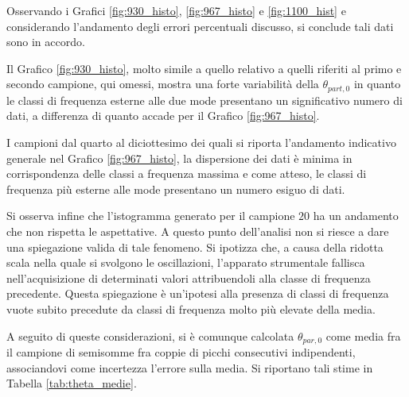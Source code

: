 \documentclass[a4paper,11pt,oneside]{article}
\begin{document}
Osservando i Grafici \ref{fig:930_histo}, \ref{fig:967_histo} e  \ref{fig:1100_hist} e considerando l'andamento degli errori percentuali discusso, si conclude tali dati sono in accordo.

Il Grafico \ref{fig:930_histo}, molto simile a quello relativo a quelli riferiti al primo e secondo campione, qui omessi, mostra una forte variabilità della $\theta_{part,0}$ in quanto le classi di frequenza esterne alle due mode presentano un significativo numero di dati, a differenza di quanto accade per il Grafico \ref{fig:967_histo}.

I campioni dal quarto al diciottesimo dei quali si riporta l'andamento indicativo generale nel Grafico \ref{fig:967_histo}, la dispersione dei dati è minima in corrispondenza delle classi a frequenza massima e come atteso, le classi di frequenza più esterne alle mode presentano un numero esiguo di dati.

Si osserva infine che l'istogramma generato per il campione $20$ ha un andamento che non rispetta le aspettative. A questo punto dell'analisi non si riesce a dare una spiegazione valida di tale fenomeno. Si ipotizza che, a causa della ridotta scala nella quale si svolgono le oscillazioni, l'apparato strumentale fallisca nell'acquisizione di determinati valori attribuendoli alla classe di frequenza precedente. Questa spiegazione è un'ipotesi alla presenza di classi di frequenza vuote subito precedute da classi di frequenza molto più elevate della media.\newline

A seguito di queste considerazioni, si è comunque calcolata $\theta_{par,0}$ come media fra il campione di semisomme fra coppie di picchi consecutivi indipendenti, associandovi come incertezza l'errore sulla media. Si riportano tali stime in Tabella \ref{tab:theta_medie}.
\end{document}
